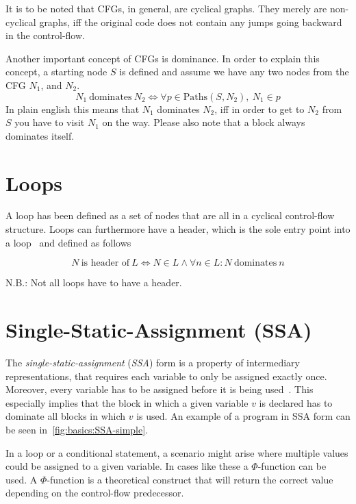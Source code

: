 It is to be noted that CFGs, in general, are cyclical graphs.
They merely are non-cyclical graphs, iff the original code does not contain any jumps going backward in the control-flow.

Another important concept of CFGs is dominance.
In order to explain this concept, a starting node $S$ is defined and assume we have any two nodes from the CFG $N_1$, and $N_2$.
$$N_1~\text{dominates}~N_2 \Longleftrightarrow \forall p \in \text{Paths}(S, N_2),~N_1 \in p$$
In plain english this means that $N_1$ dominates $N_2$, iff in order to get to $N_2$ from $S$ you have to visit $N_1$ on the way.
Please also note that a block always dominates itself.


\section{Loops}\label{sec:basics:loops}

A loop has been defined as a set of nodes that are all in a cyclical control-flow structure.
Loops can furthermore have a header, which is the sole entry point into a loop~\cite{aebi18bachelorarbeit} and defined as follows

$$N~\text{is header of}~L \Longleftrightarrow N \in L \wedge \forall n \in L: N~\text{dominates}~n$$

N.B.: Not all loops have to have a header.

\section{Single-Static-Assignment (SSA)}\label{sec:basics:ssa}

The \textit{single-static-assignment} (\textit{SSA}) form is a property of intermediary representations, that requires each variable to only be assigned exactly once.
Moreover, every variable has to be assigned before it is being used~\cite{cytron91}.
This especially implies that the block in which a given variable $v$ is declared has to dominate all blocks in which $v$ is used.
An example of a program in SSA form can be seen in~\cref{fig:basics:SSA-simple}.



In a loop or a conditional statement, a scenario might arise where multiple values could be assigned to a given variable.
In cases like these a $\Phi$-function can be used.
A $\Phi$-function is a theoretical construct that will return the correct value depending on the control-flow predecessor.

